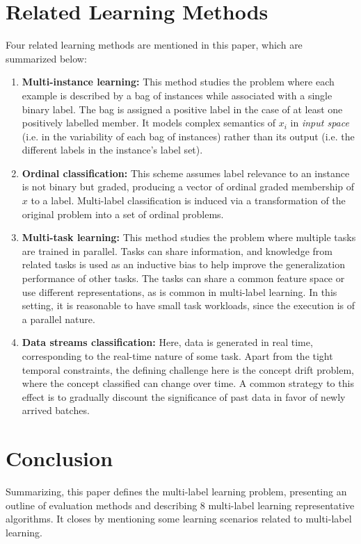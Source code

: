 \documentclass[12pt]{report}
\begin{document}
 	\section*{Related Learning Methods}
 	Four related learning methods are mentioned in this paper, which are summarized below:
 	\begin{enumerate}
 		\item \textbf{Multi-instance learning: }This method studies the problem
      where each example is described by a bag of instances while associated
      with a single binary label. The bag is assigned a positive label in the
      case of at least one positively labelled member. It models complex
      semantics of $x_i$ in \emph{input space} (i.e. in the variability of each
      bag of instances) rather than its output (i.e. the different labels in the instance's
      label set).
 		\item \textbf{Ordinal classification: } This scheme assumes label relevance
      to an instance is not binary but graded, producing a vector of ordinal graded
      membership of $x$ to a label. Multi-label classification is induced via a
      transformation of the original problem into a set of ordinal problems.
 		\item \textbf{Multi-task learning: }This method studies the problem where
      multiple tasks are trained in parallel. Tasks can share information, and
      knowledge from related tasks is used as an inductive bias to help improve
      the generalization performance of other tasks. The  tasks can share a
      common feature space or use different representations, as is common in
      multi-label learning. In this setting, it is reasonable to have small task
      workloads, since the execution is of a parallel nature. 
 		\item \textbf{Data streams classification: } Here, data is generated in real
      time, corresponding to the real-time nature of some task. Apart from the
      tight temporal constraints, the defining challenge here is the concept
      drift problem, where the concept classified can change over time. A common
      strategy to this effect is to gradually discount the significance of past
      data in favor of newly arrived batches.
     
 	\end{enumerate}
 	
	\section*{Conclusion}
	Summarizing, this paper defines the multi-label learning problem, presenting
  an outline of evaluation methods and describing 8 multi-label learning
  representative algorithms. It closes by mentioning some learning scenarios
  related to multi-label learning.
\end{document}
